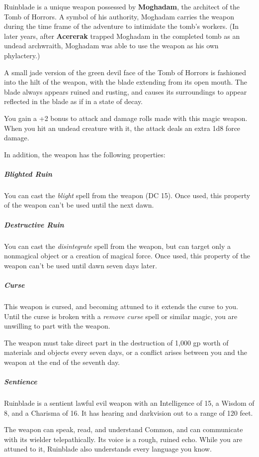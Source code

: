 \documentclass[10pt,a4paper,twoside,bg=print,twocolumn,openany,nodeprecatedcode]{dndbook}
\begin{document}
Ruinblade is a unique weapon possessed by \textbf{Moghadam}, the architect of the Tomb of Horrors. A symbol of his authority, Moghadam carries the weapon during the time frame of the adventure to intimidate the tomb's workers. (In later years, after \textbf{Acererak} trapped Moghadam in the completed tomb as an undead archwraith, Moghadam was able to use the weapon as his own phylactery.)

A small jade version of the green devil face of the Tomb of Horrors is fashioned into the hilt of the weapon, with the blade extending from its open mouth. The blade always appears ruined and rusting, and causes its surroundings to appear reflected in the blade as if in a state of decay.

You gain a +2 bonus to attack and damage rolls made with this magic weapon. When you hit an undead creature with it, the attack deals an extra 1d8 force damage.

In addition, the weapon has the following properties:

\subparagraph{Blighted Ruin}
You can cast the \textit{blight} spell from the weapon (DC 15). Once used, this property of the weapon can't be used until the next dawn.

\subparagraph{Destructive Ruin}
You can cast the \textit{disintegrate} spell from the weapon, but can target only a nonmagical object or a creation of magical force. Once used, this property of the weapon can't be used until dawn seven days later.

\subparagraph{Curse}
This weapon is cursed, and becoming attuned to it extends the curse to you. Until the curse is broken with a \textit{remove curse} spell or similar magic, you are unwilling to part with the weapon.

The weapon must take direct part in the destruction of 1,000 gp worth of materials and objects every seven days, or a conflict arises between you and the weapon at the end of the seventh day.

\subparagraph{Sentience}
Ruinblade is a sentient lawful evil weapon with an Intelligence of 15, a Wisdom of 8, and a Charisma of 16. It has hearing and darkvision out to a range of 120 feet.

The weapon can speak, read, and understand Common, and can communicate with its wielder telepathically. Its voice is a rough, ruined echo. While you are attuned to it, Ruinblade also understands every language you know.
\end{document}
